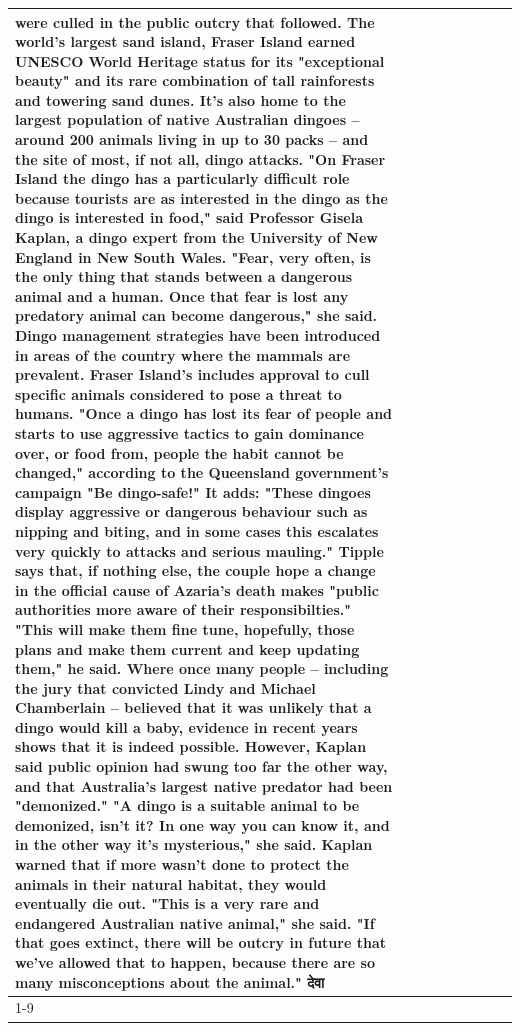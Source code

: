 \begin{table}[H]
\begin{tabular}{lllrlllll}
were culled in the public outcry that followed. The world's largest sand island, Fraser Island earned UNESCO World Heritage status for its "exceptional beauty" and its rare combination of tall rainforests and towering sand dunes. It's also home to the largest population of native Australian dingoes -- around 200 animals living in up to 30 packs -- and the site of most, if not all, dingo attacks. "On Fraser Island the dingo has a particularly difficult role because tourists are as interested in the dingo as the dingo is interested in food," said Professor Gisela Kaplan, a dingo expert from the University of New England in New South Wales. "Fear, very often, is the only thing that stands between a dangerous animal and a human. Once that fear is lost any predatory animal can become dangerous," she said. Dingo management strategies have been introduced in areas of the country where the mammals are prevalent. Fraser Island's includes approval to cull specific animals considered to pose a threat to humans. "Once a dingo has lost its fear of people and starts to use aggressive tactics to gain dominance over, or food from, people the habit cannot be changed," according to the Queensland government's campaign "Be dingo-safe!" It adds: "These dingoes display aggressive or dangerous behaviour such as nipping and biting, and in some cases this escalates very quickly to attacks and serious mauling." Tipple says that, if nothing else, the couple hope a change in the official cause of Azaria's death makes "public authorities more aware of their responsibilties." "This will make them fine tune, hopefully, those plans and make them current and keep updating them," he said. Where once many people -- including the jury that convicted Lindy and Michael Chamberlain -- believed that it was unlikely that a dingo would kill a baby, evidence in recent years shows that it is indeed possible. However, Kaplan said public opinion had swung too far the other way, and that Australia's largest native predator had been "demonized." "A dingo is a suitable animal to be demonized, isn't it? In one way you can know it, and in the other way it's mysterious," she said. Kaplan warned that if more wasn't done to protect the animals in their natural habitat, they would eventually die out. "This is a very rare and endangered Australian native animal," she said. "If that goes extinct, there will be outcry in future that we've allowed that to happen, because there are so many misconceptions about the animal." देवा \\
\cline{1-9}

\end{tabular}
\end{table}

